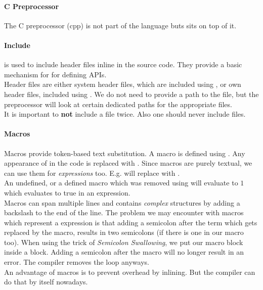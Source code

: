 

\paragraph{C Preprocessor}
The C preprocessor (cpp) is not part of the language buts sits on top of it.

\paragraph{Include}
 is used to include header files inline in the source code. They provide a basic mechanism for for defining APIs.\\
Header files are either system header files, which are included using , or own header files, included using . We do not need to provide a path to the file, but the preprocessor will look at certain dedicated paths for the appropriate files.\\
It is important to \textbf{not} include a file twice. Also one should never include  files.

\paragraph{Macros}
Macros provide token-based text substitution. A macro is defined using . Any appearance of  in the code is replaced with . Since macros are purely textual, we can use them for \textit{expressions} too. E.g.  will replace  with .\\
An undefined, or a defined macro which was removed using  will evaluate to $1$ which evaluates to true in an expression.\\
Macros can span multiple lines and contains \textit{complex} structures by adding a backslash to the end of the line. The problem we may encounter with macros which represent a expression is that adding a semicolon after the term which gets replaced by the macro, results in two semicolons (if there is one in our macro too). When using the trick of \textit{Semicolon Swallowing}, we put our macro block inside a  block. Adding a semicolon after the macro will no longer result in an error. The compiler removes the loop anyways.\\
An advantage of macros is to prevent overhead by inlining. But the compiler can do that by itself nowadays.

